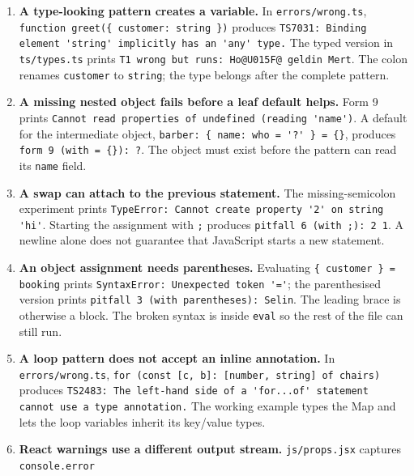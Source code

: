 \begin{enumerate}
\def\labelenumi{\arabic{enumi}.}
\item
  \textbf{A type-looking pattern creates a variable.} In \passthrough{\lstinline!errors/wrong.ts!},
  \passthrough{\lstinline!function greet(\{ customer: string \})!} produces
  \passthrough{\lstinline!TS7031: Binding element 'string' implicitly has an 'any' type.!}
  The typed version in \passthrough{\lstinline!ts/types.ts!} prints \passthrough{\lstinline!T1 wrong but runs: Ho@U015F@ geldin Mert!}.
  The colon renames \passthrough{\lstinline!customer!} to \passthrough{\lstinline!string!}; the type belongs after the complete pattern.
\item
  \textbf{A missing nested object fails before a leaf default helps.} Form 9 prints
  \passthrough{\lstinline!Cannot read properties of undefined (reading 'name')!}. A default for the intermediate
  object, \passthrough{\lstinline!barber: \{ name: who = '?' \} = \{\}!}, produces \passthrough{\lstinline!form 9 (with = \{\}): ?!}.
  The object must exist before the pattern can read its \passthrough{\lstinline!name!} field.
\item
  \textbf{A swap can attach to the previous statement.} The missing-semicolon experiment prints
  \passthrough{\lstinline!TypeError: Cannot create property '2' on string 'hi'!}.
  Starting the assignment with \passthrough{\lstinline!;!} produces \passthrough{\lstinline!pitfall 6 (with ;): 2 1!}.
  A newline alone does not guarantee that JavaScript starts a new statement.
\item
  \textbf{An object assignment needs parentheses.} Evaluating \passthrough{\lstinline!\{ customer \} = booking!} prints
  \passthrough{\lstinline!SyntaxError: Unexpected token '='!}; the parenthesised version prints
  \passthrough{\lstinline!pitfall 3 (with parentheses): Selin!}. The leading brace is otherwise a block.
  The broken syntax is inside \passthrough{\lstinline!eval!} so the rest of the file can still run.
\item
  \textbf{A loop pattern does not accept an inline annotation.} In \passthrough{\lstinline!errors/wrong.ts!},
  \passthrough{\lstinline!for (const [c, b]: [number, string] of chairs)!} produces
  \passthrough{\lstinline!TS2483: The left-hand side of a 'for...of' statement cannot use a type annotation.!}
  The working example types the Map and lets the loop variables inherit its key/value types.
\item
  \textbf{React warnings use a different output stream.} \passthrough{\lstinline!js/props.jsx!} captures \passthrough{\lstinline!console.error!}

\end{enumerate}
